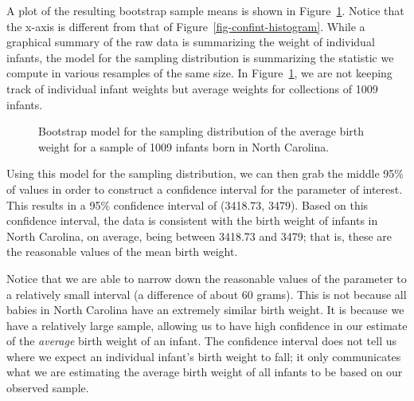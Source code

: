 \documentclass[
  letterpaper,
  DIV=11,
  numbers=noendperiod]{scrreprt}
\theoremstyle{plain}
\theoremstyle{definition}
\theoremstyle{definition}
\theoremstyle{remark}
\begin{document}
A plot of the resulting bootstrap sample means is shown in
Figure~\ref{fig-confint-samp-distn}. Notice that the x-axis is different
from that of Figure~\ref{fig-confint-histogram}. While a graphical
summary of the raw data is summarizing the weight of individual infants,
the model for the sampling distribution is summarizing the statistic we
compute in various resamples of the same size. In
Figure~\ref{fig-confint-samp-distn}, we are not keeping track of
individual infant weights but average weights for collections of 1009
infants.

\begin{figure}


\caption{\label{fig-confint-samp-distn}Bootstrap model for the sampling
distribution of the average birth weight for a sample of 1009 infants
born in North Carolina.}

\end{figure}%

Using this model for the sampling distribution, we can then grab the
middle 95\% of values in order to construct a confidence interval for
the parameter of interest. This results in a 95\% confidence interval of
(3418.73, 3479). Based on this confidence interval, the data is
consistent with the birth weight of infants in North Carolina, on
average, being between 3418.73 and 3479; that is, these are the
reasonable values of the mean birth weight.

Notice that we are able to narrow down the reasonable values of the
parameter to a relatively small interval (a difference of about 60
grams). This is not because all babies in North Carolina have an
extremely similar birth weight. It is because we have a relatively large
sample, allowing us to have high confidence in our estimate of the
\emph{average} birth weight of an infant. The confidence interval does
not tell us where we expect an individual infant's birth weight to fall;
it only communicates what we are estimating the average birth weight of
all infants to be based on our observed sample.
\end{document}
